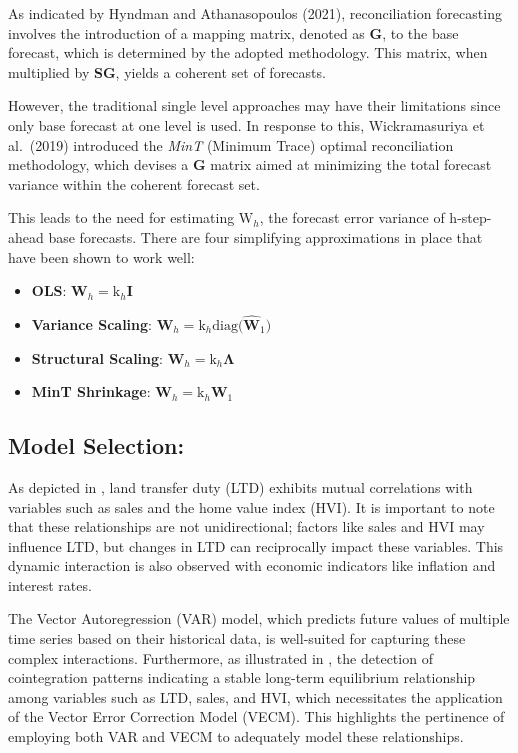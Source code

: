 \documentclass[11pt,a4paper,]{article}
\begin{document}
As indicated by Hyndman and Athanasopoulos (2021), reconciliation forecasting involves the introduction of a mapping matrix, denoted as \textbf{G}, to the base forecast, which is determined by the adopted methodology. This matrix, when multiplied by \textbf{SG}, yields a coherent set of forecasts.

However, the traditional single level approaches may have their limitations since only base forecast at one level is used. In response to this, Wickramasuriya et al.~(2019) introduced the \emph{MinT} (Minimum Trace) optimal reconciliation methodology, which devises a \textbf{G} matrix aimed at minimizing the total forecast variance within the coherent forecast set.

This leads to the need for estimating \(\text{W}_{h}\), the forecast error variance of h-step-ahead base forecasts. There are four simplifying approximations in place that have been shown to work well:

\begin{itemize}
\item
  \textbf{OLS}: \(\mathbf{W}_{h} = \text{k}_{h}\mathbf{I}\)
\item
  \textbf{Variance Scaling}: \(\mathbf{W}_{h} = \text{k}_{h}\text{diag(}\mathbf{\hat{W}}_{1}\text{)}\)
\item
  \textbf{Structural Scaling}: \(\mathbf{W}_{h} = \text{k}_{h}\mathbf{\Lambda}\)
\item
  \textbf{MinT Shrinkage}: \(\mathbf{W}_{h} = \text{k}_{h}\mathbf{W}_{1}\)
\end{itemize}

\subsection{Model Selection:}\label{model-selection}

As depicted in \emph{}, land transfer duty (LTD) exhibits mutual correlations with variables such as sales and the home value index (HVI). It is important to note that these relationships are not unidirectional; factors like sales and HVI may influence LTD, but changes in LTD can reciprocally impact these variables. This dynamic interaction is also observed with economic indicators like inflation and interest rates.

The Vector Autoregression (VAR) model, which predicts future values of multiple time series based on their historical data, is well-suited for capturing these complex interactions. Furthermore, as illustrated in \emph{}, the detection of cointegration patterns indicating a stable long-term equilibrium relationship among variables such as LTD, sales, and HVI, which necessitates the application of the Vector Error Correction Model (VECM). This highlights the pertinence of employing both VAR and VECM to adequately model these relationships.
\end{document}
